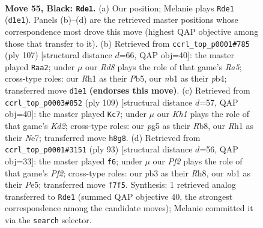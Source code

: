 \documentclass[11pt]{article}
\begin{document}
\clearpage

\begin{figure}[p]\centering
\begin{subfigure}{0.46\textwidth}\centering
\resizebox{\linewidth}{!}{%
\newchessgame
\chessboard[
  setfen={7k/5p1p/1n4p1/p3p1P1/P3P3/1P3KRP/6P1/RN1r3r b - - 25 55},
  showmover=false,
  pgfstyle=straightmove, color=movearrow, markmove={d1-e1}
]}
\caption{}
\end{subfigure}\hfill
\begin{subfigure}{0.46\textwidth}\centering
\resizebox{\linewidth}{!}{%
\newchessgame
\chessboard[
  setfen={8/2p1k1p1/4p2p/1p5P/rP1RRPP1/3P2K1/1r6/8 b - - 0 54},
  showmover=false,
  pgfstyle=straightmove, color=movearrow, markmove={a4-a2}
]}
\caption{}
\end{subfigure}
\\[4pt]
\begin{subfigure}{0.46\textwidth}\centering
\resizebox{\linewidth}{!}{%
\newchessgame
\chessboard[
  setfen={1r6/r2kn3/P2p1pp1/2pP4/2N2P1p/2KR3P/1P4P1/R7 b - - 17 55},
  showmover=false,
  pgfstyle=straightmove, color=movearrow, markmove={d7-c7}
]}
\caption{}
\end{subfigure}\hfill
\begin{subfigure}{0.46\textwidth}\centering
\resizebox{\linewidth}{!}{%
\newchessgame
\chessboard[
  setfen={2r4r/1p1nkp2/8/1P1Rpp2/p1P5/3N1PPp/P1R2K1P/8 b - - 1 47},
  showmover=false,
  pgfstyle=straightmove, color=movearrow, markmove={f7-f6}
]}
\caption{}
\end{subfigure}
\caption{\textbf{Move 55, Black: \texttt{Rde1}.} (a) Our position; Melanie plays \texttt{Rde1} (\texttt{d1e1}). Panels (b)--(d) are the retrieved master positions whose correspondence most drove this move (highest QAP objective among those that transfer to it). (b) Retrieved from \texttt{ccrl\_top\_p0001\#785} (ply 107) [structural distance $d$=66, QAP obj=40]: the master played \texttt{Raa2}; under $\mu$ our \emph{Rd8} plays the role of that game's \emph{Ra5}; cross-type roles: our \emph{R}h1 as their \emph{P}b5, our \emph{n}b1 as their \emph{p}b4; transferred move \texttt{d1e1} \textbf{(endorses this move)}. (c) Retrieved from \texttt{ccrl\_top\_p0003\#852} (ply 109) [structural distance $d$=57, QAP obj=40]: the master played \texttt{Kc7}; under $\mu$ our \emph{Kh1} plays the role of that game's \emph{Kd2}; cross-type roles: our \emph{p}g5 as their \emph{R}b8, our \emph{R}h1 as their \emph{N}e7; transferred move \texttt{h8g8}. (d) Retrieved from \texttt{ccrl\_top\_p0001\#3151} (ply 93) [structural distance $d$=56, QAP obj=33]: the master played \texttt{f6}; under $\mu$ our \emph{Pf2} plays the role of that game's \emph{Pf2}; cross-type roles: our \emph{p}b3 as their \emph{R}h8, our \emph{n}b1 as their \emph{P}e5; transferred move \texttt{f7f5}. Synthesis: 1 retrieved analog transferred to \texttt{Rde1} (summed QAP objective 40, the strongest correspondence among the candidate moves); Melanie committed it via the \texttt{search} selector.}
\label{fig:thought-m109}
\end{figure}
\end{document}
